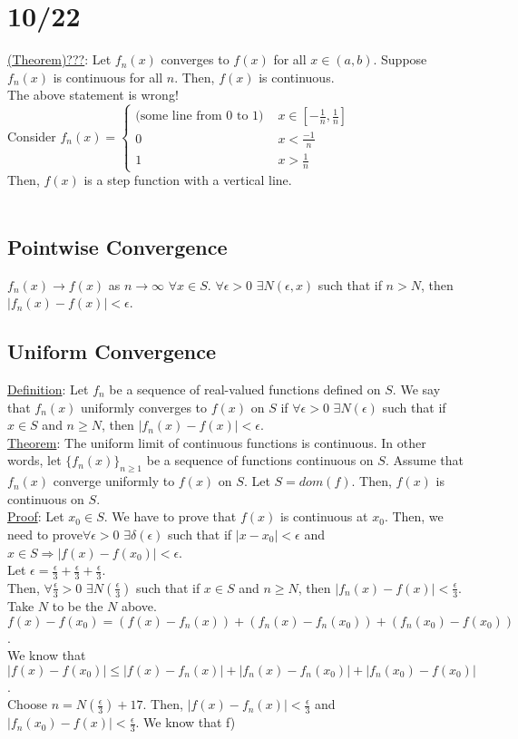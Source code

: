 \documentclass[11pt]{article}
\begin{document}
\section*{10/22}
	\underline{(Theorem)???}: Let $f_n(x)$ converges to $f(x)$ for all $x \in
	(a,b)$. Suppose $f_n(x)$ is continuous for all $n$. Then, $f(x)$ is 
	continuous.\\
	The above statement is wrong!\\ Consider $f_n(x) = \begin{cases} 
	\text{(some line from 0 to 1) } & x \in [-\frac{1}{n},\frac{1}{n}]\\ 0 & 
	x < \frac{-1}{n} \\ 1 & x > \frac{1}{n} \end{cases}$\\ Then, $f(x)$ is a 
	step function with a vertical line.\\\\
	\subsection*{Pointwise Convergence}
		$f_n(x) \to f(x)$ as $n \to \infty$ $\forall x \in S$. $\forall \epsilon
		> 0$ $\exists N(\epsilon, x)$ such that if $n > N$, then $|f_n(x) -
		f(x)| < \epsilon$.
	\subsection*{Uniform Convergence}
		\underline{Definition}: Let $f_n$ be a sequence of real-valued 
		functions defined on $S$. We say that $f_n(x)$ uniformly converges to
		$f(x)$ on $S$ if $\forall \epsilon > 0$ $\exists N(\epsilon)$ such that
		if $x \in S$ and $n \ge N$, then $|f_n(x) - f(x)| < \epsilon$.\\
		\underline{Theorem}: The uniform limit of continuous functions is 
		continuous. In other words, let $\{f_n(x)\}_{n \ge 1}$ be a sequence of 
		functions continuous on $S$. Assume that $f_n(x)$ converge uniformly
		to $f(x)$ on $S$. Let $S = dom(f)$. Then, $f(x)$ is continuous on $S$.\\
		\underline{Proof}: Let $x_0 \in S$. We have to prove that $f(x)$ is
		continuous at $x_0$. Then, we need to prove$\forall \epsilon > 0$ 
		$\exists \delta(\epsilon)$ such that if $|x - x_0| < \epsilon$ and $x 
		\in S \Rightarrow |f(x)- f(x_0)| < \epsilon$.\\
		Let $\epsilon = \frac{\epsilon}{3} + \frac{\epsilon}{3} + 
		\frac{\epsilon}{3}$.\\
		Then, $\forall \frac{\epsilon}{3} > 0$ $\exists N(\frac{\epsilon}{3})$
		such that if $x \in S$ and $ n \ge N$, then $|f_n(x) - f(x)| < 
		\frac{\epsilon}{3}$.\\
		Take $N$ to be the $N$ above. $f(x) - f(x_0) = (f(x) - f_n(x)) + (f_n(x) 
		-	f_n(x_0)) + (f_n(x_0) - f(x_0))$.\\
		We know that $|f(x) - f(x_0)| \le |f(x) - f_n(x)| + |f_n(x) -	f_n(x_0)| 
		+ |f_n(x_0) - f(x_0)|$.\\
		Choose $n = N(\frac{\epsilon}{3}) + 17$. Then, $|f(x) - f_n(x)| < 
		\frac{\epsilon}{3}$ and $|f_n(x_0) - f(x)| < \frac{\epsilon}{3}$.
		We know that f)
\end{document}
